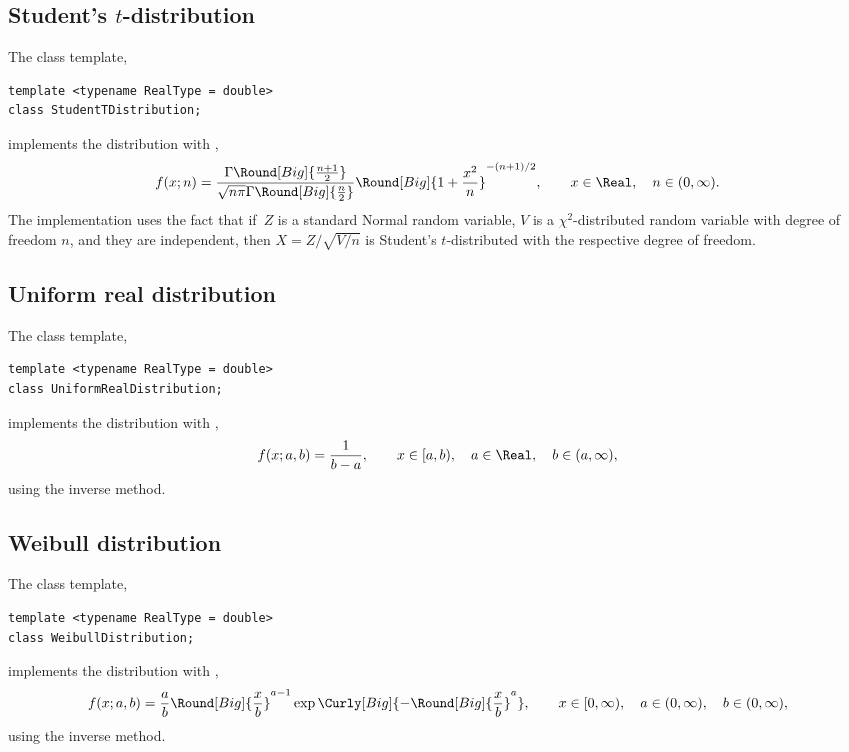 \subsection{Student's \texorpdfstring{$t$}{t}-distribution}
\label{sub:Student's t-distribution}

The class template,
\begin{verbatim}
template <typename RealType = double>
class StudentTDistribution;
\end{verbatim}
implements the distribution with \pdf,
\begin{equation*}
  f(x;n) =
  \frac{\Gamma\Round[Big]{\frac{n + 1}{2}}}
  {\sqrt{n\pi}\Gamma\Round[Big]{\frac{n}{2}}}
  \Round[Big]{1 + \frac{x^2}{n}}^{-(n + 1)/2},\qquad
  x \in \Real,\quad n \in (0, \infty).
\end{equation*}
The implementation uses the fact that if~$Z$ is a standard Normal random
variable, $V$ is a $\chi^2$-distributed random variable with degree of freedom
$n$, and they are independent, then $X = Z/\sqrt{V / n}$ is Student's
$t$-distributed with the respective degree of freedom.

\subsection{Uniform real distribution}
\label{sub:Uniform real distribution}

The class template,
\begin{verbatim}
template <typename RealType = double>
class UniformRealDistribution;
\end{verbatim}
implements the distribution with \pdf,
\begin{equation*}
  f(x;a,b) = \frac{1}{b - a},\qquad
  x \in [a, b),\quad a \in \Real,\quad b \in (a, \infty),
\end{equation*}
using the inverse method.

\subsection{Weibull distribution}
\label{sub:Weibull distribution}

The class template,
\begin{verbatim}
template <typename RealType = double>
class WeibullDistribution;
\end{verbatim}
implements the distribution with \pdf,
\begin{equation*}
  f(x;a,b) = \frac{a}{b}\Round[Big]{\frac{x}{b}}^{a - 1}
  \exp\Curly[Big]{-\Round[Big]{\frac{x}{b}}^a},\qquad
  x \in [0, \infty),\quad a \in (0, \infty),\quad b \in (0, \infty),
\end{equation*}
using the inverse method.

